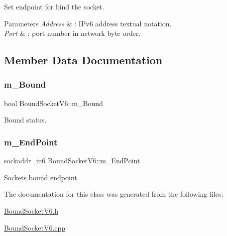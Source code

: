 Set endpoint for bind the socket. 
\begin{DoxyParams}{Parameters}
{\em Address} & \+: I\+Pv6 address textual notation. \\
\hline
{\em Port} & \+: port number in network byte order. \\
\hline
\end{DoxyParams}


\subsection{Member Data Documentation}
\mbox{\label{classBoundSocketV6_a0f09faafc821fe3ebe890821d1b4cb10}} 
\subsubsection{\texorpdfstring{m\+\_\+\+Bound}{m\_Bound}}
{\footnotesize\ttfamily bool Bound\+Socket\+V6\+::m\+\_\+\+Bound\hspace{0.3cm}{\ttfamily [protected]}}



Bound status. 

\mbox{\label{classBoundSocketV6_abf6063eee350425ae5a105200be62df0}} 
\subsubsection{\texorpdfstring{m\+\_\+\+End\+Point}{m\_EndPoint}}
{\footnotesize\ttfamily sockaddr\+\_\+in6 Bound\+Socket\+V6\+::m\+\_\+\+End\+Point\hspace{0.3cm}{\ttfamily [protected]}}



Socket\textquotesingle{}s bound endpoint. 



The documentation for this class was generated from the following files\+:\begin{DoxyCompactItemize}
\item 
\hyperlink{BoundSocketV6_8h}{Bound\+Socket\+V6.\+h}\item 
\hyperlink{BoundSocketV6_8cpp}{Bound\+Socket\+V6.\+cpp}\end{DoxyCompactItemize}
